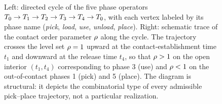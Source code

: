 \begin{figure}[t]
\begin{tikzpicture}[
    >=stealth,
    every node/.style={font=\small},
    op/.style={
      circle, draw, thick, minimum size=10mm, inner sep=1pt,
      fill=white
    },
    cycarrow/.style={->, thick}
  ]
\end{tikzpicture}
\caption[Five-phase operator cycle with $\rcontact$ trace.]{
Left: directed cycle of the five phase operators
$T_{0} \to T_{1} \to T_{2} \to T_{3} \to
T_{4} \to T_{0}$, with each vertex labeled by its
phase name (\emph{pick}, \emph{load}, \emph{use}, \emph{unload},
\emph{place}). Right: schematic trace of the contact order
parameter $\rcontact$ along the cycle. The trajectory crosses
the level set $\rho = 1$ upward at the
contact-establishment time $t_{1}$ and downward at the release
time $t_{4}$, so that $\rho > 1$ on the open interior
$(t_{1}, t_{4})$ corresponding to phase 3 (use) and
$\rho < 1$ on the out-of-contact phases 1 (pick) and 5
(place). The diagram is structural: it depicts the combinatorial
type of every admissible pick--place trajectory, not a particular
realization.}
\label{fig:operator-loop}
\end{figure}
